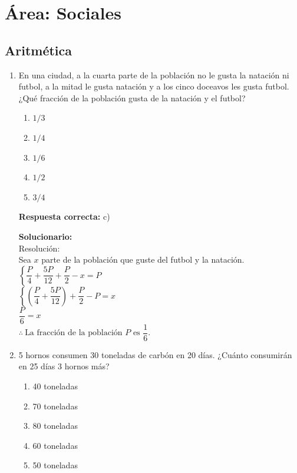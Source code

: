 \section*{Área: Sociales}

\subsection*{Aritmética}

\begin{enumerate}
	
	
	
	\item En una ciudad, a la cuarta parte de la población no le gusta la natación ni futbol,
	a la mitad le gusta natación y a los cinco doceavos les gusta futbol.
	¿Qué fracción de la población gusta de la natación y el futbol?
	
	\begin{enumerate}[label=\alph*)]
		\item $1/3$
		\item $1/4$
		\item $1/6$
		\item $1/2$
		\item $3/4$
	\end{enumerate}
	
	\textbf{Respuesta correcta:} c)
	
	\vspace{2mm}
	\textbf{Solucionario:}\\
	Resolución:\\
	Sea $x$ parte de la población que guste del futbol y la natación.\\
	
	$\left\{\dfrac{P}{4}+\dfrac{5P}{12}+\dfrac{P}{2}-x=P\right.$\\
	
	$\left\{\left(\dfrac{P}{4}+\dfrac{5P}{12}\right)+\dfrac{P}{2}-P=x\right.$\\
	
	$\dfrac{P}{6}=x$\\
	
	$\therefore\ \text{La fracción de la población $P$ es } \dfrac{1}{6}.$
	
	\item 5 hornos consumen 30 toneladas de carbón en 20 días.
	¿Cuánto consumirán en 25 días 3 hornos más?
	
	\begin{enumerate}[label=\alph*)]
		\item 40 toneladas
		\item 70 toneladas
		\item 80 toneladas
		\item 60 toneladas
		\item 50 toneladas
	\end{enumerate}
	

\end{enumerate}
